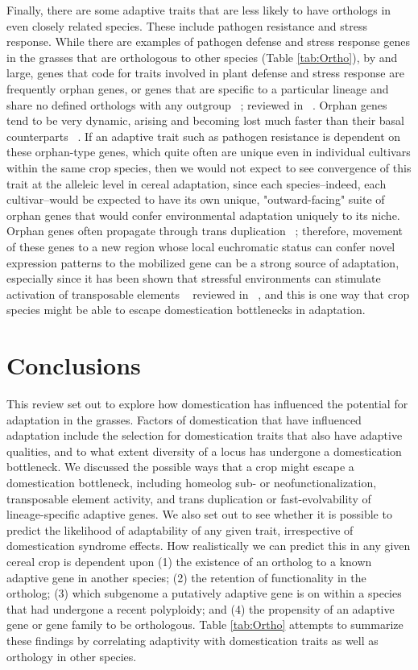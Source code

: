 \documentclass[12pt]{article}
\begin{document}
Finally, there are some adaptive traits that are less likely to have orthologs in even closely related species. These include pathogen resistance and stress response. While there are examples of pathogen defense and stress response genes in the grasses that are orthologous to other species (Table \ref{tab:Ortho}), by and large, genes that code for traits involved in plant defense and stress response are frequently orphan genes, or genes that are specific to a particular lineage and share no defined orthologs with any outgroup ~\citep{Woodhouse2011}; reviewed in ~\citep{Arendsee2014}. Orphan genes tend to be very dynamic, arising and becoming lost much faster than their basal counterparts ~\citep{Freeling2008}.  If an adaptive trait such as pathogen resistance is dependent on these orphan-type genes, which quite often are unique even in individual cultivars within the same crop species, then we would not expect to see convergence of this trait at the alleleic level in cereal adaptation, since each species--indeed, each cultivar--would be expected to have its own unique, "outward-facing" suite of orphan genes that would confer environmental adaptation uniquely to its niche. Orphan genes often propagate through trans duplication ~\citep{Freeling2008, Arendsee2014}; therefore, movement of these genes to a new region whose local euchromatic status can confer novel expression patterns to the mobilized gene can be a strong source of adaptation, especially since it has been shown that stressful environments can stimulate activation of transposable elements ~\citep{Beguiristain2001, Makarevitch2015}  reviewed in ~\citep{Negi2016}, and this is one way that crop species might be able to escape domestication bottlenecks in adaptation.

\section*{Conclusions}
This review set out to explore how domestication has influenced the potential for adaptation in the grasses.  Factors of domestication that have influenced adaptation include the selection for domestication traits that also have adaptive qualities, and to what extent diversity of a locus has undergone a domestication bottleneck. We discussed the possible ways that a crop might escape a domestication bottleneck, including homeolog sub- or neofunctionalization, transposable element activity, and trans duplication or fast-evolvability of lineage-specific adaptive genes. We also set out to see whether it is possible to predict the likelihood of adaptability of any given trait, irrespective of domestication syndrome effects. How realistically we can predict this in any given cereal crop is dependent upon  (1) the existence of an ortholog to a known adaptive gene in another species; (2) the retention of functionality in the ortholog; (3)  which subgenome a putatively adaptive gene is on within a species that had undergone a recent polyploidy; and (4) the propensity of an adaptive gene or gene family to be orthologous.   Table \ref{tab:Ortho} attempts to summarize these findings by correlating adaptivity with domestication traits as well as orthology in other species.  




\end{document}
